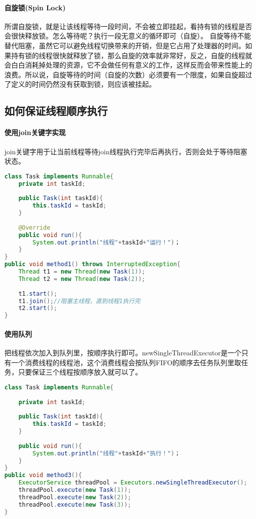 \documentclass[../../../interview-questions.tex]{subfiles}
\begin{document}
\paragraph{自旋锁(Spin Lock)}所谓自旋锁，就是让该线程等待一段时间，不会被立即挂起，看持有锁的线程是否会很快释放锁。怎么等待呢？执行一段无意义的循环即可（自旋）。
自旋等待不能替代阻塞，虽然它可以避免线程切换带来的开销，但是它占用了处理器的时间。如果持有锁的线程很快就释放了锁，那么自旋的效率就非常好，反之，自旋的线程就会白白消耗掉处理的资源，它不会做任何有意义的工作，这样反而会带来性能上的浪费。所以说，自旋等待的时间（自旋的次数）必须要有一个限度，如果自旋超过了定义的时间仍然没有获取到锁，则应该被挂起。

\subsection{如何保证线程顺序执行}

\paragraph{使用join关键字实现}join关键字用于让当前线程等待join线程执行完毕后再执行，否则会处于等待阻塞状态。

\begin{lstlisting}[language=Java]
class Task implements Runnable{
    private int taskId;
    
    public Task(int taskId){
        this.taskId = taskId; 
    }    
    
    @Override
    public void run(){
        System.out.println("线程"+taskId+"运行！")；
    }
}
public void method1() throws InterruptedException{
    Thread t1 = new Thread(new Task(1));
    Thread t2 = new Thread(new Task(2));
    
    t1.start();
    t1.join();//阻塞主线程，直到线程1执行完
    t2.start();
}
\end{lstlisting}

\paragraph{使用队列}把线程依次加入到队列里，按顺序执行即可。newSingleThreadExecutor是一个只有一个消费线程的线程池，这个消费线程会按队列FIFO的顺序去任务队列里取任务，只要保证三个线程按顺序放入就可以了。

\begin{lstlisting}[language=Java]
class Task implements Runnable{
    
    private int taskId;
    
    public Task(int taskId){
        this.taskId = taskId;
    }
    
    public void run(){
        System.out.println("线程"+taskId+"执行！")；
    }
}
public void method3(){
    ExecutorService threadPool = Executors.newSingleThreadExecutor();
    threadPool.execute(new Task(1));
    threadPool.execute(new Task(2));
    threadPool.execute(new Task(3));
}
\end{lstlisting}
\end{document}
